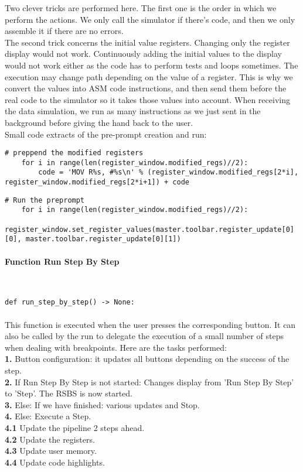 \documentclass{article}
\newcommand{\n}[0]{\(\backslash\)n}
\newcommand{\subsubsubsection}[1]{\paragraph{#1}\mbox{}\\}
\begin{document}
Two clever tricks are performed here. The first one is the order in which we perform the actions. We only call the simulator if there's code, and then we only assemble it if there are no errors. \\
The second trick concerns the initial value registers. Changing only the register display would not work. Continuously adding the initial values to the display would not work either as the code has to perform tests and loops sometimes. The execution may change path depending on the value of a register. This is why we convert the values into ASM code instructions, and then send them before the real code to the simulator so it takes those values into account. When receiving the data simulation, we run as many instructions as we just sent in the background before giving the hand back to the user. \\
Small code extracts of the pre-prompt creation and run: \\

\begin{lstlisting}[language=MyPython]
# preppend the modified registers
    for i in range(len(register_window.modified_regs)//2):
        code = 'MOV R%s, #%s\n' % (register_window.modified_regs[2*i], register_window.modified_regs[2*i+1]) + code
\end{lstlisting}
\begin{lstlisting}[language=MyPython]
# Run the preprompt
    for i in range(len(register_window.modified_regs)//2):
        register_window.set_register_values(master.toolbar.register_update[0][0], master.toolbar.register_update[0][1])
\end{lstlisting}
\subsubsubsection{Function Run Step By Step}
\begin{lstlisting}[language=MyPython]
def run_step_by_step() -> None:
\end{lstlisting}
\paragraph{}

This function is executed when the user presses the corresponding button. It can also be called by the run to delegate the execution of a small number of steps when dealing with breakpoints. Here are the tasks performed: \\
\textbf{1.} Button configuration: it updates all buttons depending on the success of the step. \\
\textbf{2.} If Run Step By Step is not started: Changes display from 'Run Step By Step' to 'Step'. The RSBS is now started. \\
\textbf{3.} Else: If we have finished: various updates and Stop. \\
\textbf{4.} Else: Execute a Step. \\
\textbf{4.1} Update the pipeline 2 steps ahead. \\
\textbf{4.2} Update the registers. \\
\textbf{4.3} Update user memory. \\
\textbf{4.4} Update code highlights. \\
\end{document}

